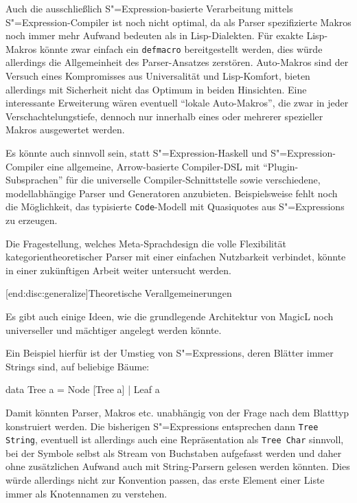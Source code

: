 \documentclass[12pt, a4paper, bibgerm]{scrbook}
\newenvironment{DIFnomarkup}{}{}
\newcommand\icode[1]{\lstinline?#1?}
\newcommand\lsubsection{}
\newcommand{\sexp}{S"=Expression}
\newcommand{\sexps}{S"=Expressions}
\begin{document}
Auch die ausschließlich \sexp{}-basierte Verarbeitung mittels
\sexp{}-Compiler ist noch nicht optimal, da als Parser spezifizierte
Makros noch immer mehr Aufwand bedeuten als in Lisp-Dialekten. Für
exakte Lisp-Makros könnte zwar einfach ein \icode{defmacro}
bereitgestellt werden, dies würde allerdings die Allgemeinheit des
Parser-Ansatzes zerstören. Auto-Makros sind der Versuch eines
Kompromisses aus Universalität und Lisp-Komfort, bieten allerdings mit
Sicherheit nicht das Optimum in beiden Hinsichten. Eine interessante
Erweiterung wären eventuell ``lokale Auto-Makros'', die zwar in jeder
Verschachtelungstiefe, dennoch nur innerhalb eines oder mehrerer
spezieller Makros ausgewertet werden. 

Es könnte auch sinnvoll sein, statt \sexp{}-Haskell und \sexp{}-Compiler
eine allgemeine, Arrow-basierte Compiler-DSL mit ``Plugin-Subsprachen''
für die universelle Compiler-Schnittstelle sowie verschiedene,
modellabhängige Parser und Generatoren anzubieten. Beispielsweise fehlt
noch die Möglichkeit, das typisierte \icode{Code}-Modell mit Quasiquotes
aus \sexps{} zu erzeugen.

Die Fragestellung, welches Meta-Sprachdesign die volle Flexibilität
kategorientheoretischer Parser mit einer einfachen Nutzbarkeit
verbindet, könnte in einer zukünftigen Arbeit weiter untersucht werden.

\lsubsection[end:disc:generalize]{Theoretische Verallgemeinerungen}

Es gibt auch einige Ideen, wie die grundlegende Architektur von MagicL
noch universeller und mächtiger angelegt werden könnte.

Ein Beispiel hierfür ist der Umstieg von \sexps{}, deren Blätter immer
Strings sind, auf beliebige Bäume:
\begin{DIFnomarkup}\begin{code}
data Tree a = Node [Tree a]
            | Leaf a
\end{code}\end{DIFnomarkup}
Damit könnten Parser, Makros etc. unabhängig von der Frage nach dem
Blatttyp konstruiert werden. Die bisherigen \sexps{} entsprechen dann
\icode{Tree String}, eventuell ist allerdings auch eine Repräsentation
als \icode{Tree Char} sinnvoll, bei der Symbole selbst als Stream von
Buchstaben aufgefasst werden und daher ohne zusätzlichen Aufwand auch
mit String-Parsern gelesen werden könnten. Dies würde allerdings nicht
zur Konvention passen, das erste Element einer Liste immer als
Knotennamen zu verstehen.
\end{document}

